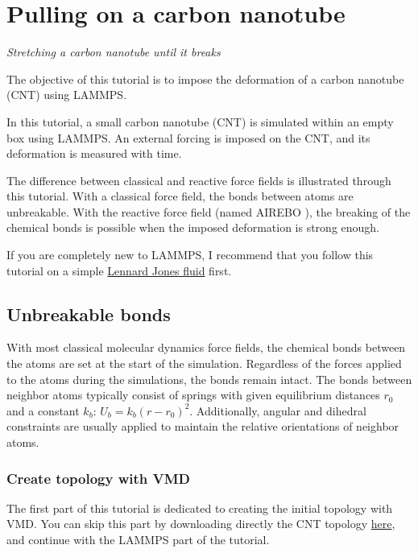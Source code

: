 \chapter{Pulling on a carbon nanotube}
\label{carbon-nanotube-label}

\noindent \vspace{-1cm} \noindent \textcolor{graytitle}{\textit{{\Large Stretching a carbon nanotube until it breaks}}\vspace{0.5cm} }

\vspace{0.25cm} \noindent The objective of this tutorial is to impose the deformation
of a carbon nanotube (CNT) using LAMMPS.

\vspace{0.25cm} \noindent In this tutorial, a small carbon nanotube (CNT) is simulated
within an empty box using LAMMPS. An external 
forcing is imposed on the CNT, and its deformation is measured with time.

\vspace{0.25cm} \noindent The difference between classical and reactive force fields
is illustrated through this tutorial.
With a classical force field, the bonds between atoms
are unbreakable. With the reactive
force field (named AIREBO \cite{stuart2000reactive}),
the breaking of the chemical bonds is possible when
the imposed deformation is strong enough.

\vspace{0.25cm} \noindent If you are completely new to LAMMPS, I recommend that
you follow this tutorial on a simple \hyperref[lennard-jones-label]{Lennard Jones fluid} first.

\section{Unbreakable bonds}
\noindent With most classical molecular dynamics force fields, the chemical bonds
between the atoms are set at the start of the simulation. Regardless of the 
forces applied to the atoms during the simulations, the bonds remain intact.
The bonds between neighbor atoms typically consist of springs with
given equilibrium distances $r_0$ and a constant $k_b$:
$U_b = k_b \left( r - r_0 \right)^2$.
Additionally, angular and dihedral constraints are usually applied to maintain
the relative orientations of neighbor atoms. 

\subsection{Create topology with VMD}
\noindent The first part of this tutorial is dedicated to creating
the initial topology with VMD. You can skip this part by
downloading directly the CNT topology \href{https://lammpstutorials.github.io/lammpstutorials-inputs/level1/breaking-a-carbon-nanotube/unbreakable-bonds/cnt_molecular.data}{here}, 
and continue with the LAMMPS part of the tutorial.

